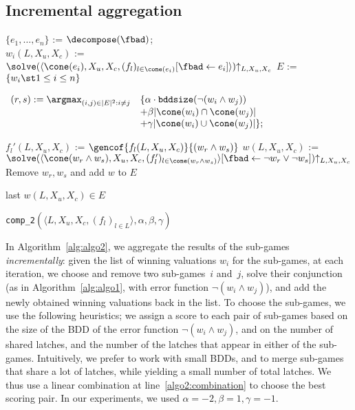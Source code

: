 \documentclass[submission,copyright,creativecommons]{eptcs}
\begin{document}
\subsection{Incremental aggregation}
\begin{algorithm}
	\small
	$\{e_1,\ldots,e_n\}$ := $\decompose(\fbad)$;
	\\
	{
		$w_i(L, X_u, X_c)$ := $\solve(\langle 
		\cone(e_i), X_u, X_c, (f_l)_{l \in \cone(e_i)}[\fbad \leftarrow
    e_i] \rangle){\uparrow_{L,X_u,X_c}}$\;
                \label{alg2-loc:endofloop}
	}
	$E$ := $\{ w_i \st 1 \le i \le n\}$\;
	{
		$\begin{array}{ll}
			(r,s) := \argmax_{(i,j) \in |E|^2 : i \neq j } &
			  \{{\alpha} \cdot \texttt{bddsize}(\lnot (w_i \land
				w_j))\\
			&+ \beta |\cone(w_i) \cap \cone(w_j)|\\
			&+ \gamma |\cone(w_i) \cup \cone(w_j)|\};
		\end{array}$
		\label{algo2:combination}

		{
			$f_l'(L,X_u,X_c)$ := $\gencof{f_l(L,X_u,X_c)}{
			(w_r \land w_s)}$
		}
		$w(L,X_u,X_c)$ := $\solve(\langle \cone(w_r \land w_s),X_u,X_c,
		(f_l')_{l \in \cone(w_r \land w_s)}\rangle[ \fbad \leftarrow\lnot 
		w_r \lor \lnot w_s]){\uparrow_{L,X_u,X_c}}$\;
		\label{line:algo2:solve}
		Remove $w_r,w_s$ and add $w$ to $E$\;
		\label{line:addrs}
	}
	\Return last $w(L,X_u,X_c) \in E$\;
\caption{\texttt{comp\_2}$(\langle L, X_u, X_c, (f_l)_{l\in L}\rangle, \alpha,
\beta, \gamma)$}
\label{alg:algo2}
\end{algorithm}
In Algorithm~\ref{alg:algo2}, we aggregate the results of the sub-games
\emph{incrementally}: given the list of winning valuations $w_i$ for the
sub-games, at each iteration, we choose and remove two sub-games~$i$ and~$j$,
solve their conjunction (as in Algorithm~\ref{alg:algo1}, with error function
$\lnot (w_i \land w_j)$), and add the newly obtained winning valuations back in
the list. 
To choose the sub-games, we use the following heuristics; we assign a score to
each pair of sub-games based on the size of the BDD of the error function $\lnot
(w_i\land w_j)$, and on the number of shared latches, and the number
of the latches that appear in either of the sub-games.  Intuitively, we prefer
to work with small BDDs, and to merge sub-games that share a lot of latches,
while yielding a small number of total latches.  We thus use a linear
combination at line~\ref{algo2:combination} to choose the best scoring pair. In
our experiments, we used $\alpha=-2, \beta = 1, \gamma = -1$.
\end{document}
